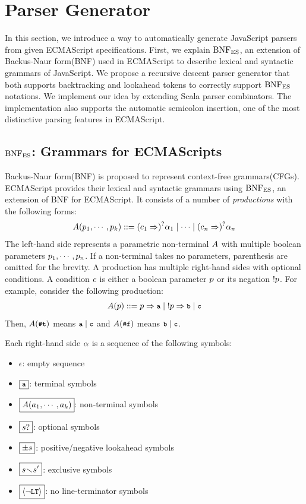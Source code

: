 \section{Parser Generator}

In this section, we introduce a way to automatically generate JavaScript parsers
from given ECMAScript specifications. First, we explain \( \text{BNF}_{\text{ES}} \), an extension
of Backus-Naur form(BNF) used in ECMAScript to describe lexical and
syntactic grammars of JavaScript. We propose a recursive descent parser generator
that both supports backtracking and lookahead tokens to correctly support
\( \text{BNF}_{\text{ES}} \) notations. We implement our idea by extending Scala parser combinators.
The implementation also supports the automatic semicolon insertion,
one of the most distinctive parsing features in ECMAScript.

\subsection{\( \text{BNF}_{\text{ES}} \): Grammars for ECMAScripts}

Backus-Naur form(BNF) is proposed to represent context-free grammars(CFGs).
ECMAScript provides their lexical and syntactic grammars using \( \text{BNF}_{\text{ES}} \),
an extension of BNF for ECMAScript.
It consists of a number of \textit{productions} with the following forms:
\[
  A(p_1, \cdots, p_k) ::=
  (c_1 \Rightarrow)^? \alpha_1 \mid
  \cdots \mid
  (c_n \Rightarrow)^? \alpha_n
\]
The left-hand side represents a parametric non-terminal \( A \) with
multiple boolean parameters \( p_1, \cdots, p_n \).
If a non-terminal takes no parameters, parenthesis are omitted for the brevity.
A production has multiple right-hand sides with optional conditions.
A condition \( c \) is either a boolean parameter \( p \)
or its negation \( ! p \).
For example, consider the following production:
\[
  A(p) ::= p \Rightarrow \texttt{\small a}
  \mid \; !p \Rightarrow \texttt{\small b}
  \mid  \texttt{\small c}
\]
Then, \( A(\texttt{\small\#t}) \) means \( \texttt{\small a} \mid \texttt{\small c} \)
and \( A(\texttt{\small\#f}) \) means \( \texttt{\small b} \mid \texttt{\small c} \).

Each right-hand side \( \alpha \) is a sequence of the following symbols:
\begin{itemize}
  \item \( \boxed{\epsilon} \): empty sequence
  \item \( \boxed{\texttt{\small a}} \): terminal symbols
  \item \( \boxed{A(a_1, \cdots, a_k)} \): non-terminal symbols
  \item \( \boxed{s?} \): optional symbols
  \item \( \boxed{\pm s} \): positive/negative lookahead symbols
  \item \( \boxed{s \!\smallsetminus\! s'} \): exclusive symbols
  \item \( \boxed{\left<\neg\texttt{\small LT}\right>} \): no line-terminator symbols
\end{itemize}

